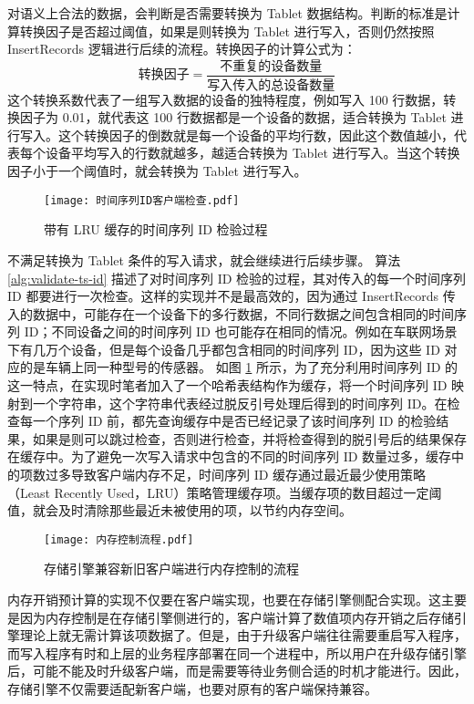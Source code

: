 对语义上合法的数据，会判断是否需要转换为 Tablet 数据结构。判断的标准是计算转换因子是否超过阈值，如果是则转换为 Tablet 进行写入，否则仍然按照 InsertRecords 逻辑进行后续的流程。转换因子的计算公式为：
\begin{equation}
  \text{转换因子} = \frac{\text{不重复的设备数量}}{\text{写入传入的总设备数量}}
\end{equation}
这个转换系数代表了一组写入数据的设备的独特程度，例如写入 100 行数据，转换因子为 0.01，就代表这 100 行数据都是一个设备的数据，适合转换为 Tablet 进行写入。这个转换因子的倒数就是每一个设备的平均行数，因此这个数值越小，代表每个设备平均写入的行数就越多，越适合转换为 Tablet 进行写入。当这个转换因子小于一个阈值时，就会转换为 Tablet 进行写入。

\begin{figure}
  \centering
  \texttt{[image: 时间序列ID客户端检查.pdf]}
  \caption{带有 LRU 缓存的时间序列 ID 检验过程}
  \label{fig:lru-ts-id-validate}
\end{figure}

不满足转换为 Tablet 条件的写入请求，就会继续进行后续步骤。
算法 \ref{alg:validate-ts-id} 描述了对时间序列 ID 检验的过程，其对传入的每一个时间序列 ID 都要进行一次检查。这样的实现并不是最高效的，因为通过 InsertRecords 传入的数据中，可能存在一个设备下的多行数据，不同行数据之间包含相同的时间序列 ID；不同设备之间的时间序列 ID 也可能存在相同的情况。例如在车联网场景下有几万个设备，但是每个设备几乎都包含相同的时间序列 ID，因为这些 ID 对应的是车辆上同一种型号的传感器。 如图 \ref{fig:lru-ts-id-validate} 所示，为了充分利用时间序列 ID 的这一特点，在实现时笔者加入了一个哈希表结构作为缓存，将一个时间序列 ID 映射到一个字符串，这个字符串代表经过脱反引号处理后得到的时间序列 ID。在检查每一个序列 ID 前，都先查询缓存中是否已经记录了该时间序列 ID 的检验结果，如果是则可以跳过检查，否则进行检查，并将检查得到的脱引号后的结果保存在缓存中。为了避免一次写入请求中包含的不同的时间序列 ID 数量过多，缓存中的项数过多导致客户端内存不足，时间序列 ID 缓存通过最近最少使用策略（Least Recently Used，LRU）策略管理缓存项。当缓存项的数目超过一定阈值，就会及时清除那些最近未被使用的项，以节约内存空间。

\begin{figure}
  \centering
  \texttt{[image: 内存控制流程.pdf]}
  \caption{存储引擎兼容新旧客户端进行内存控制的流程}
  \label{fig:mem-control-compatibility}
\end{figure}


内存开销预计算的实现不仅要在客户端实现，也要在存储引擎侧配合实现。这主要是因为内存控制是在存储引擎侧进行的，客户端计算了数值项内存开销之后存储引擎理论上就无需计算该项数据了。但是，由于升级客户端往往需要重启写入程序，而写入程序有时和上层的业务程序部署在同一个进程中，所以用户在升级存储引擎后，可能不能及时升级客户端，而是需要等待业务侧合适的时机才能进行。因此，存储引擎不仅需要适配新客户端，也要对原有的客户端保持兼容。


